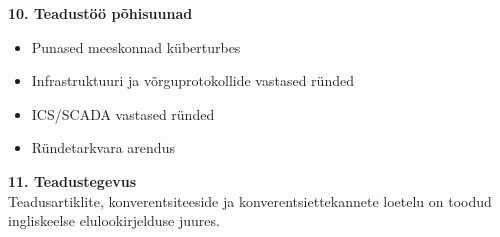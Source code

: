 \textbf{10. Teadust\"o\"o p\~ohisuunad} 
\begin{itemize}
\item Punased meeskonnad küberturbes
\item Infrastruktuuri ja võrguprotokollide vastased ründed
\item ICS/SCADA vastased ründed
\item Ründetarkvara arendus
\end{itemize}

\textbf{11. Teadustegevus}\\
Teadusartiklite, konverentsiteeside ja konverentsiettekannete loetelu on toodud ingliskeelse elulookirjelduse juures. 

